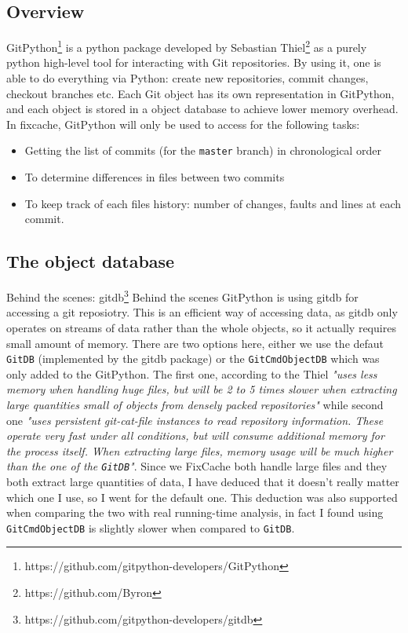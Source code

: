 \documentclass[12pt,twoside,notitlepage]{report}
\newcommand{\fxch}{FixCache }
\begin{document}
\subsection{Overview}
GitPython\footnote{https://github.com/gitpython-developers/GitPython} is a python package developed by Sebastian Thiel\footnote{https://github.com/Byron} as a purely python high-level tool for interacting with Git repositories. By using it, one is able to do everything via Python: create new repositories, commit changes, checkout branches etc. Each Git object has its own representation in GitPython, and each object is stored in a object database to achieve lower memory overhead. In fixcache, GitPython will only be used to access for the following tasks:
\begin{itemize}
\item Getting the list of commits (for the \texttt{master} branch) in chronological order
\item To determine differences in files between two commits
\item To keep track of each files history: number of changes, faults and lines at each commit.
\end{itemize}
\subsection{The object database}\label{dbbackend}
Behind the scenes: gitdb\footnote{https://github.com/gitpython-developers/gitdb}
Behind the scenes GitPython is using gitdb for accessing a git reposiotry. This is an efficient way of accessing data, as gitdb only operates on streams of data rather than the whole objects, so it actually requires small amount of memory. There are two options here, either we use the defaut \texttt{GitDB} (implemented by the gitdb package) or the \texttt{GitCmdObjectDB} which was only added to the GitPython. The first one, according to the Thiel \textit{"uses less memory when handling huge files, but will be 2 to 5 times slower when extracting large quantities
small of objects from densely packed repositories"} while second one \textit{"uses persistent git-cat-file instances to read repository information. These operate very fast
under all conditions, but will consume additional memory for the process itself. When extracting large files, memory
usage will be much higher than the one of the \texttt{GitDB}"}. Since we \fxch both handle large files and they both extract large quantities of data, I have deduced that it doesn't really matter which one I use, so I went for the default one. This deduction was also supported when comparing the two with real running-time analysis, in fact I found using \texttt{GitCmdObjectDB} is slightly slower when compared to \texttt{GitDB}.
\cleardoublepage
\end{document}
